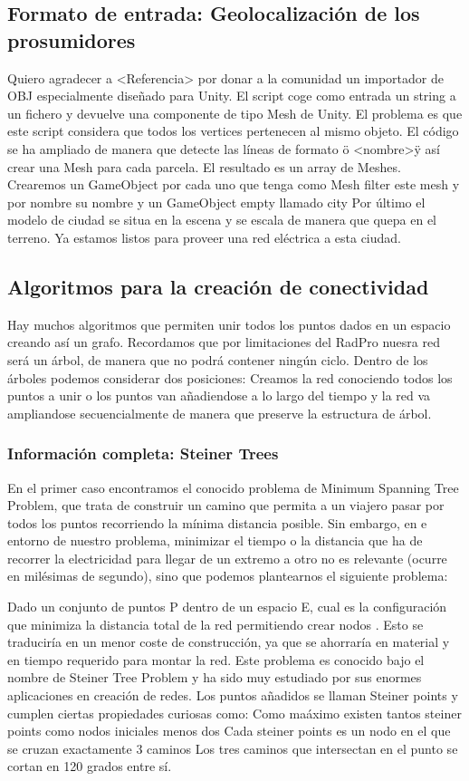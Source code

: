 \documentclass[12pt,a4paper,openright,oneside]{article}
\numberwithin{equation}{section}
\theoremstyle{definition}
\begin{document}
\subsection{Formato de entrada: Geolocalización de los prosumidores}
Quiero agradecer a <Referencia> por donar a la comunidad un importador de OBJ especialmente diseñado para Unity. El script coge como entrada un string a un fichero y devuelve una componente de tipo Mesh de Unity. El problema es que este script considera que todos los vertices pertenecen al mismo objeto. El código se ha ampliado de manera que detecte las líneas de formato \"o <nombre>\" y así crear una Mesh para cada parcela. El resultado es un array de Meshes. Crearemos un GameObject por cada uno que tenga como Mesh filter este mesh y por nombre su nombre y un GameObject empty llamado city 
Por último el modelo de ciudad se situa en la escena y se escala de manera que quepa en el terreno. Ya estamos listos para proveer una red eléctrica a esta ciudad.


\subsection{Algoritmos para la creación de conectividad}
Hay muchos algoritmos que permiten unir todos los puntos dados en un espacio creando así un grafo. Recordamos que por limitaciones del RadPro nuesra red será un árbol, de manera que no podrá contener ningún ciclo. Dentro de los árboles podemos considerar dos posiciones: Creamos la red conociendo todos los puntos a unir o los puntos van añadiendose a lo largo del tiempo y la red va ampliandose secuencialmente de manera que preserve la estructura de árbol.

\subsubsection{Información completa: Steiner Trees}
En el primer caso encontramos el conocido problema de Minimum Spanning Tree Problem, que trata de construir un camino que permita a un viajero pasar por todos los puntos recorriendo la mínima distancia posible. Sin embargo, en e entorno de nuestro problema, minimizar  el tiempo o la distancia que ha de recorrer la electricidad para llegar de un extremo a otro no es relevante (ocurre en milésimas de segundo), sino que podemos plantearnos el siguiente problema:

Dado un conjunto de puntos P dentro de un espacio E, cual es la configuración que minimiza la distancia total de la red permitiendo crear nodos . Esto se traduciría en un menor coste de construcción, ya que se ahorraría en material y en tiempo requerido para montar la red. Este problema es conocido bajo el nombre de Steiner Tree Problem y ha sido muy estudiado por sus enormes aplicaciones en creación de redes. Los puntos añadidos se llaman Steiner points y cumplen ciertas propiedades curiosas como: 
Como maáximo existen tantos steiner points como nodos iniciales menos dos
Cada steiner points es un nodo en el que se cruzan exactamente 3 caminos
Los tres caminos que intersectan en el punto se cortan en 120 grados entre sí.
\end{document}
